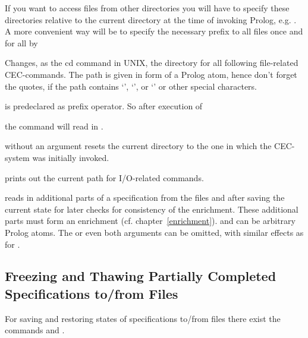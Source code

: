 If you want to access files from other directories you will have to specify these
directories relative to the current directory at the time of invoking Prolog, e.g.
. A more convenient way will be to specify the
necessary prefix to all files once and for all by\bigskip

\begin{command}
Changes, as the cd command in UNIX, the directory for all following
file-related CEC-commands.
The path is given in form of a Prolog atom, hence don't forget the
quotes, if the path contains `\kw{/}', `', or `' or other special
characters.

 is predeclared as prefix operator. So after execution 
of \bigskip

 \bigskip

\noindent
the command  will read in .

 without an argument resets the current directory to the one in
which the CEC-system was initially invoked.
\end{command}

\begin{command}
prints out the current path for I/O-related commands.
\end{command}

\begin{command}
reads in additional parts of a specification from the files 
 and 
after saving the current state for later checks for consistency of the enrichment. 
These additional parts must form an enrichment (cf. chapter~\ref{enrichment}).
 and  can be arbitrary Prolog atoms.
The  or even both arguments 
can be omitted, with similar effects as for .
\end{command}

\subsection{Freezing and Thawing Partially Completed Specifications to/from Files}
\label{FreezeCommand}
\label{ThawCommand}

For saving and restoring states of specifications to/from files there exist the 
commands  and .\bigskip

